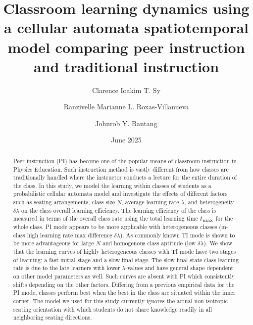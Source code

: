 \documentclass[twocolumn,secnumarabic,amssymb, nobibnotes, aps, prd]{revtex4-2}
\begin{document}
\title{Classroom learning dynamics using a cellular automata spatiotemporal model comparing peer instruction and traditional instruction}%

\author{Clarence Ioakim T. Sy}%
%

\author{Ranzivelle Marianne L. Roxas-Villanueva}%
%

\author{Johnrob Y. Bantang}%
%

\date{June 2025}%

\begin{abstract}
    Peer instruction (PI) has become {one of the popular means} of classroom instruction in Physics Education.
    Such instruction method is vastly different from how classes are traditionally handled where the instructor conducts a lecture for the entire duration of the class.
    In this study, we model the {learning} within classes of students as a probabilistic cellular automata model 
    and investigate the effects of different factors such as seating arrangements, class size $N$, average learning rate ${\lambda}$, and heterogeneity $\delta{\lambda}$ on the class overall learning efficiency.
    The learning efficiency of the class is measured in terms of the overall class rate {using the total learning time $t_{\rm max}$} for the whole class.
    PI mode appears to be more applicable with heterogeneous classes (in-class high learning rate max difference $\delta{\lambda}$).
    As commonly known TI mode is shown to be more advantageous for large $N$ and homogenous class aptitude (low $\delta{\lambda}$).
    We show that the learning curves of highly heterogeneous classes with TI mode have two stages of learning: a fast initial stage and a slow final stage.
    The slow final state class learning rate is due to the late learners with lower $\lambda$-values and have general shape dependent on other model parameters as well.
    Such curves are absent with PI which consistently shifts depending on the other factors.
    Differing from a previous empirical data for the PI mode, classes perform best when the best in the class are situated within the inner corner.
    The model we used for this study currently ignores the actual non-isotropic seating orientation with which students do not share knowledge readily in all neighboring seating directions.

\end{abstract}
\end{document}
